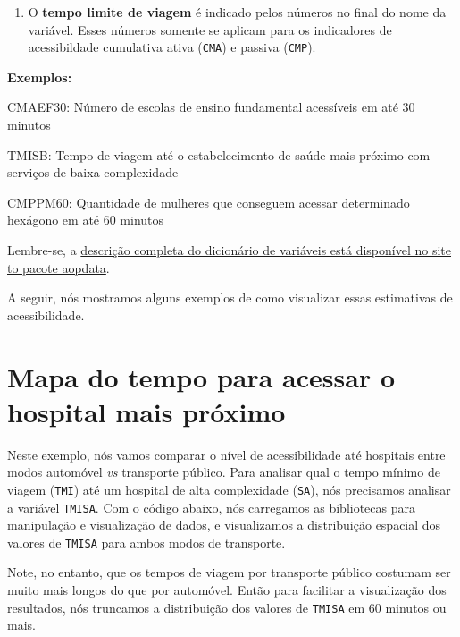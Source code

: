 \documentclass[
  letterpaper,
  DIV=11,
  numbers=noendperiod]{scrreprt}
\providecommand{\tightlist}{%
  \setlength{\itemsep}{0pt}\setlength{\parskip}{0pt}}\usepackage{longtable,booktabs,array}
\begin{document}
\begin{enumerate}
\def\labelenumi{\arabic{enumi})}
\setcounter{enumi}{2}
\tightlist
\item
  O \textbf{tempo limite de viagem} é indicado pelos números no final do
  nome da variável. Esses números somente se aplicam para os indicadores
  de acessibildade cumulativa ativa (\texttt{CMA}) e passiva
  (\texttt{CMP}).
\end{enumerate}

\textbf{Exemplos:}

{CMA}{EF}{30}: Número de escolas de ensino fundamental acessíveis em até
30 minutos

{TMI}{SB}: Tempo de viagem até o estabelecimento de saúde mais próximo
com serviços de baixa complexidade

{CMP}{PM}{60}: Quantidade de mulheres que conseguem acessar determinado
hexágono em até 60 minutos

Lembre-se, a
\href{https://ipeagit.github.io/aopdata/articles/data_dic_pt.html}{descrição
completa do dicionário de variáveis está disponível no site to pacote
aopdata}.

A seguir, nós mostramos alguns exemplos de como visualizar essas
estimativas de acessibilidade.

\hypertarget{mapa-do-tempo-para-acessar-o-hospital-mais-pruxf3ximo}{%
\section{Mapa do tempo para acessar o hospital mais
próximo}\label{mapa-do-tempo-para-acessar-o-hospital-mais-pruxf3ximo}}

Neste exemplo, nós vamos comparar o nível de acessibilidade até
hospitais entre modos automóvel \emph{vs} transporte público. Para
analisar qual o tempo mínimo de viagem (\texttt{TMI}) até um hospital de
alta complexidade (\texttt{SA}), nós precisamos analisar a variável
\texttt{TMISA}. Com o código abaixo, nós carregamos as bibliotecas para
manipulação e visualização de dados, e visualizamos a distribuição
espacial dos valores de \texttt{TMISA} para ambos modos de transporte.

Note, no entanto, que os tempos de viagem por transporte público
costumam ser muito mais longos do que por automóvel. Então para
facilitar a visualização dos resultados, nós truncamos a distribuição
dos valores de \texttt{TMISA} em 60 minutos ou mais.
\end{document}
